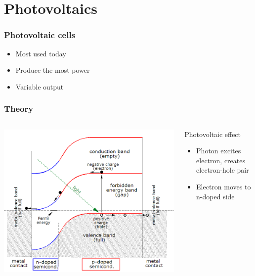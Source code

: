 \documentclass{beamer}
\begin{document}
\section{Photovoltaics}

\begin{frame}
  \frametitle{Photovoltaic cells}
\begin{itemize}
  \item Most used today
  \item Produce the most power
  \item Variable output
\end{itemize}

\end{frame}

\begin{frame}
  \frametitle{Theory}
\begin{columns}
  \begin{column}{.6\textwidth}
    \includegraphics[width=\textwidth]{./Slike/PV-band-diagram}
  \end{column}
  \begin{column}{.4\textwidth}
    \begin{block}{Photovoltaic effect}
    \begin{itemize}
      \item Photon excites electron, creates electron-hole pair
      \item Electron moves to n-doped side
    \end{itemize}
    \end{block}
  \end{column}
\end{columns}

\end{frame}
\end{document}
